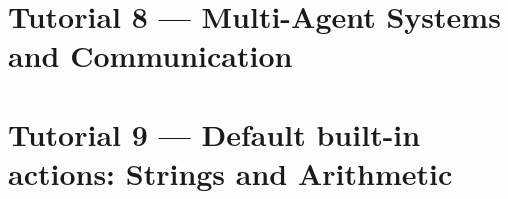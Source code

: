 \section{Tutorial 8 --- Multi-Agent Systems and Communication}

{
  \let\section\subsection
  \let\subsection\subsubsection
  \let\subsubsection\paragraph
  
  
  }

\section{Tutorial 9 --- Default built-in actions: Strings and Arithmetic}

{
  \let\section\subsection
  \let\subsection\subsubsection
  \let\subsubsection\paragraph
  
  
  }

